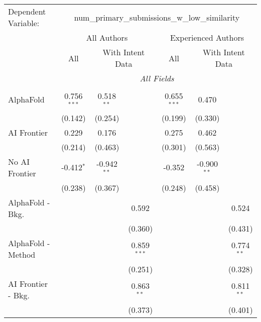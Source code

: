 \begingroup
\centering
\begin{tabular}{lcccccc}
   \tabularnewline \midrule \midrule
   Dependent Variable: & \multicolumn{6}{c}{num\_primary\_submissions\_w\_low\_similarity}\\
 & \multicolumn{3}{c}{All Authors} & \multicolumn{3}{c}{Experienced Authors} \\
\cmidrule(lr){2-4} \cmidrule(lr){5-7}
 & \multicolumn{1}{c}{All} & \multicolumn{2}{c}{With Intent Data} & \multicolumn{1}{c}{All} & \multicolumn{2}{c}{With Intent Data} \\
\cmidrule(lr){2-2} \cmidrule(lr){3-4} \cmidrule(lr){5-5} \cmidrule(lr){6-7}
 & \multicolumn{6}{c}{\textit{All Fields}} \\ \\
   AlphaFold               & 0.756$^{***}$ & 0.518$^{**}$  &               & 0.655$^{***}$ & 0.470         &   \\   
                           & (0.142)       & (0.254)       &               & (0.199)       & (0.330)       &   \\   
   AI Frontier             & 0.229         & 0.176         &               & 0.275         & 0.462         &   \\   
                           & (0.214)       & (0.463)       &               & (0.301)       & (0.563)       &   \\   
   No AI Frontier          & -0.412$^{*}$  & -0.942$^{**}$ &               & -0.352        & -0.900$^{**}$ &   \\   
                           & (0.238)       & (0.367)       &               & (0.248)       & (0.458)       &   \\   
   AlphaFold - Bkg.        &               &               & 0.592         &               &               & 0.524\\   
                           &               &               & (0.360)       &               &               & (0.431)\\   
   AlphaFold - Method      &               &               & 0.859$^{***}$ &               &               & 0.774$^{**}$\\   
                           &               &               & (0.251)       &               &               & (0.328)\\   
   AI Frontier - Bkg.      &               &               & 0.863$^{**}$  &               &               & 0.811$^{**}$\\   
                           &               &               & (0.373)       &               &               & (0.401)\\   

\end{tabular}
